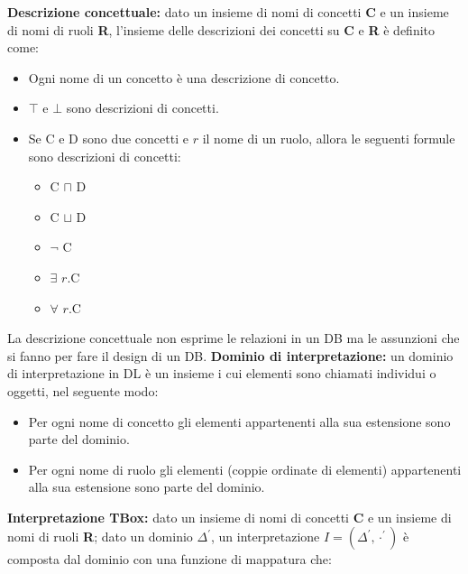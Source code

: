 \documentclass[../main.tex]{subfiles}
\begin{document}
   \textbf{Descrizione concettuale:} dato un insieme di nomi di concetti \textbf{C} e un insieme di nomi di ruoli \textbf{R}, l'insieme delle descrizioni dei concetti su \textbf{C} e \textbf{R} è definito come:
   \begin{itemize}
      \item Ogni nome di un concetto è una descrizione di concetto.
      \item $\top$ e $\bot$ sono descrizioni di concetti.
      \item Se C e D sono due concetti e $r$ il nome di un ruolo, allora le seguenti formule sono descrizioni di concetti:
      \begin{itemize}
         \item C $\sqcap$ D
         \item C $\sqcup$ D
         \item $\lnot$ C
         \item $\exists$ $r$.C
         \item $\forall$ $r$.C
      \end{itemize} 
   \end{itemize}
   La descrizione concettuale non esprime le relazioni in un DB ma le assunzioni che si fanno per fare il design di un DB.
   \spazio
   \textbf{Dominio di interpretazione:} un dominio di interpretazione in DL è un insieme i cui elementi sono chiamati individui o oggetti, nel seguente modo:
   \begin{itemize}
      \item Per ogni nome di concetto gli elementi appartenenti alla sua estensione sono parte del dominio.
      \item Per ogni nome di ruolo gli elementi (coppie ordinate di elementi) appartenenti alla sua estensione sono parte del dominio.
   \end{itemize}
   \vspace{2em}
   \textbf{Interpretazione TBox:} dato un insieme di nomi di concetti \textbf{C} e un insieme di nomi di ruoli \textbf{R}; dato un dominio $\Delta ^\prime$, un interpretazione $I=(\Delta^\prime, \cdot^\prime)$ è composta dal dominio con una funzione di mappatura che:
\end{document}
